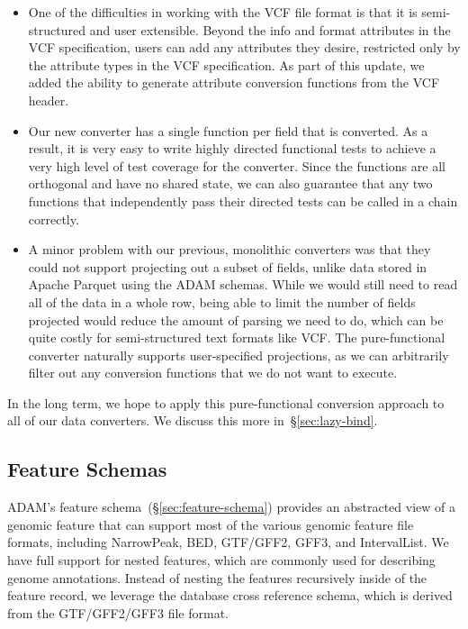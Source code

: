 \documentclass[phd]{ucbthesis}
\begin{document}
\begin{itemize}
\item One of the difficulties in working with the VCF file format is that it is
  semi-structured and user extensible. Beyond the info and format attributes
  in the VCF specification, users can add any attributes they desire, restricted
  only by the attribute types in the VCF specification. As part of this update,
  we added the ability to generate attribute conversion functions from the VCF
  header.
\item Our new converter has a single function per field that is converted. As a
  result, it is very easy to write highly directed functional tests to achieve a
  very high level of test coverage for the converter. Since the functions are
  all orthogonal and have no shared state, we can also guarantee that any two
  functions that independently pass their directed tests can be called in a
  chain correctly.
\item A minor problem with our previous, monolithic converters was that they
  could not support projecting out a subset of fields, unlike data stored in
  {Apache Parquet} using the {ADAM} schemas. While we would
  still need to read all of the data in a whole row, being able to limit the
  number of fields projected would reduce the amount of parsing we need to do,
  which can be quite costly for semi-structured text formats like VCF. The
  pure-functional converter naturally supports user-specified projections, as we
  can arbitrarily filter out any conversion functions that we do not want to
  execute.
\end{itemize}

In the long term, we hope to apply this pure-functional conversion approach to
all of our data converters. We discuss this more in~\S\ref{sec:lazy-bind}.

\subsection{Feature Schemas}
\label{sec:feature-schemas}

{ADAM}'s feature schema~(\S\ref{sec:feature-schema}) provides an abstracted view of a genomic feature
that can support most of the various genomic feature file formats, including
{NarrowPeak}, BED, GTF/GFF2, GFF3, and {IntervalList}. We have
full support for nested features, which are commonly used for describing genome
annotations. Instead of nesting the features recursively inside of the feature
record, we leverage the database cross reference schema, which is derived from
the GTF/GFF2/GFF3 file format.
\end{document}
